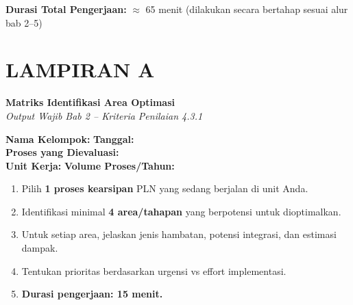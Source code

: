 \documentclass[12pt,a4paper]{report}
\newcommand{\fillline}[1][6cm]{\underline{\hspace{#1}}}
\begin{document}
\vspace{0.4cm}
\noindent\textbf{\color{plnblue}Durasi Total Pengerjaan:} $\approx$ 65 menit (dilakukan secara bertahap sesuai alur bab 2--5)


\newpage
\section*{\color{plnblue} LAMPIRAN A}
{\Large\bfseries Matriks Identifikasi Area Optimasi}\\[0.15cm]
{\normalsize\color{medgray}\textit{Output Wajib Bab 2 -- Kriteria Penilaian 4.3.1}}

\vspace{0.4cm}

\noindent\textbf{Nama Kelompok:} \fillline[5cm] \quad \textbf{Tanggal:} \fillline[3cm]\\[0.25cm]
\textbf{Proses yang Dievaluasi:} \fillline[9cm]\\[0.25cm]
\textbf{Unit Kerja:} \fillline[5cm] \quad \textbf{Volume Proses/Tahun:} \fillline[3cm]

\begin{instruksibox}
\begin{enumerate}
    \item Pilih \textbf{1 proses kearsipan} PLN yang sedang berjalan di unit Anda.
    \item Identifikasi minimal \textbf{4 area/tahapan} yang berpotensi untuk dioptimalkan.
    \item Untuk setiap area, jelaskan jenis hambatan, potensi integrasi, dan estimasi dampak.
    \item Tentukan prioritas berdasarkan urgensi vs effort implementasi.
    \item \textbf{Durasi pengerjaan: 15 menit.}
\end{enumerate}
\end{instruksibox}

\vspace{0.4cm}


\vspace{0.2cm}
\end{document}
